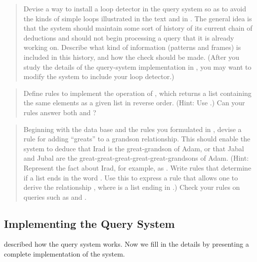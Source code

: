 \begin{quote}
 Devise a way to install a loop
detector in the query system so as to avoid the kinds of simple loops
illustrated in the text and in .
The general idea is that
the system should maintain some sort of history of its current chain of
deductions and should not begin processing a query that it is already working
on.  Describe what kind of information (patterns and frames) is included in
this history, and how the check should be made.  (After you study the details
of the query-system implementation in , you may want to
modify the system to include your loop detector.)
\end{quote}

\begin{quote}
 Define rules to implement the
 operation of , which returns a list
containing the same elements as a given list in reverse order.  (Hint: Use
.)  Can your rules answer both 
and  ?
\end{quote}

\begin{quote}
 Beginning with the data base and
the rules you formulated in , devise a rule for adding
``greats'' to a grandson relationship. This should enable the system to deduce
that Irad is the great-grandson of Adam, or that Jabal and Jubal are the
great-great-great-great-great-grandsons of Adam.  (Hint: Represent the fact
about Irad, for example, as .  Write rules
that determine if a list ends in the word .  Use this to express
a rule that allows one to derive the relationship , where  is a list ending in .)  Check your rules
on queries such as  and .
\end{quote}

\subsection{Implementing the Query System}
\label{Section 4.4.4}

 described how the query system works. Now we fill in the
details by presenting a complete implementation of the system.



